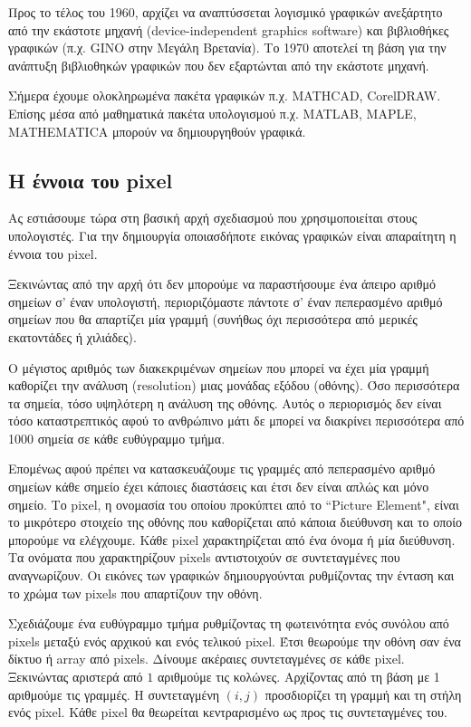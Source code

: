 Προς το τέλος του 1960, αρχίζει να αναπτύσσεται λογισμικό γραφικών ανεξάρτητο από την εκάστοτε μηχανή (device-independent graphics software) και βιβλιοθήκες γραφικών (π.χ. GINO στην Μεγάλη Βρετανία). Το 1970 αποτελεί τη βάση για την ανάπτυξη βιβλιοθηκών γραφικών που δεν εξαρτώνται από την εκάστοτε μηχανή.

Σήμερα έχουμε ολοκληρωμένα πακέτα γραφικών π.χ. MATHCAD, CorelDRAW. Επίσης μέσα από μαθηματικά πακέτα υπολογισμού π.χ. MATLAB, MAPLE, MATHEMATICA μπορούν να δημιουργηθούν γραφικά.

\subsection{Η έννοια του pixel}

Ας εστιάσουμε τώρα στη βασική αρχή σχεδιασμού που χρησιμοποιείται στους υπολογιστές. Για την δημιουργία οποιασδήποτε εικόνας γραφικών είναι απαραίτητη η έννοια του pixel.

Ξεκινώντας από την αρχή ότι δεν μπορούμε να παραστήσουμε ένα άπειρο αριθμό σημείων σ' έναν υπολογιστή, περιοριζόμαστε πάντοτε σ' έναν πεπερασμένο αριθμό σημείων που θα απαρτίζει μία γραμμή (συνήθως όχι περισσότερα από μερικές εκατοντάδες ή χιλιάδες).

Ο μέγιστος αριθμός των διακεκριμένων σημείων που μπορεί να έχει μία γραμμή καθορίζει την ανάλυση (resolution) μιας μονάδας εξόδου (οθόνης). Όσο περισσότερα τα σημεία, τόσο υψηλότερη η ανάλυση της οθόνης. Αυτός ο περιορισμός δεν είναι τόσο καταστρεπτικός αφού το ανθρώπινο μάτι δε μπορεί να διακρίνει περισσότερα από 1000 σημεία σε κάθε ευθύγραμμο τμήμα.

Επομένως αφού πρέπει να κατασκευάζουμε τις γραμμές από πεπερασμένο αριθμό σημείων κάθε σημείο έχει κάποιες διαστάσεις και έτσι δεν είναι απλώς και μόνο σημείο. Το pixel, η ονομασία του οποίου προκύπτει από το ``Picture Element", είναι το μικρότερο στοιχείο της οθόνης που καθορίζεται από κάποια διεύθυνση και το οποίο μπορούμε να ελέγχουμε. Κάθε pixel χαρακτηρίζεται από ένα όνομα ή μία διεύθυνση. Τα ονόματα που χαρακτηρίζουν pixels αντιστοιχούν σε συντεταγμένες που αναγνωρίζουν. Οι εικόνες των γραφικών δημιουργούνται ρυθμίζοντας την ένταση και το χρώμα των pixels που απαρτίζουν την οθόνη. 

Σχεδιάζουμε ένα ευθύγραμμο τμήμα ρυθμίζοντας τη φωτεινότητα ενός συνόλου από pixels μεταξύ ενός αρχικού και ενός τελικού pixel. Έτσι θεωρούμε την οθόνη σαν ένα δίκτυο ή array από pixels. Δίνουμε ακέραιες συντεταγμένες σε κάθε pixel. Ξεκινώντας αριστερά από $1$ αριθμούμε τις κολώνες. Αρχίζοντας από τη βάση με 1 αριθμούμε τις γραμμές. Η συντεταγμένη $(i, j)$ προσδιορίζει τη γραμμή και τη στήλη ενός pixel. Κάθε pixel θα θεωρείται κεντραρισμένο ως προς τις συντεταγμένες του.

